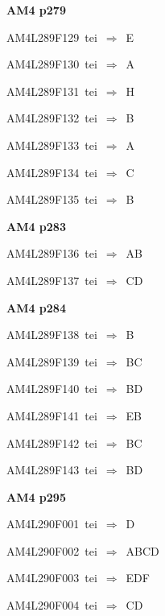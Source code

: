 \par\vfill\eject
{\bf\hfill AM4 p279\hfill\hbox{}}\par\bigskip
{\sixrm AM4L289F129\ {\sixit tei}\ }$\Rightarrow$\ E\par\smallskip
{\sixrm AM4L289F130\ {\sixit tei}\ }$\Rightarrow$\ A\par\smallskip
{\sixrm AM4L289F131\ {\sixit tei}\ }$\Rightarrow$\ H\par\smallskip
{\sixrm AM4L289F132\ {\sixit tei}\ }$\Rightarrow$\ B\par\smallskip
{\sixrm AM4L289F133\ {\sixit tei}\ }$\Rightarrow$\ A\par\smallskip
{\sixrm AM4L289F134\ {\sixit tei}\ }$\Rightarrow$\ C\par\smallskip
{\sixrm AM4L289F135\ {\sixit tei}\ }$\Rightarrow$\ B\par\smallskip

\par\vfill\eject
{\bf\hfill AM4 p283\hfill\hbox{}}\par\bigskip
{\sixrm AM4L289F136\ {\sixit tei}\ }$\Rightarrow$\ AB\par\smallskip
{\sixrm AM4L289F137\ {\sixit tei}\ }$\Rightarrow$\ CD\par\smallskip

\par\vfill\eject
{\bf\hfill AM4 p284\hfill\hbox{}}\par\bigskip
{\sixrm AM4L289F138\ {\sixit tei}\ }$\Rightarrow$\ B\par\smallskip
{\sixrm AM4L289F139\ {\sixit tei}\ }$\Rightarrow$\ BC\par\smallskip
{\sixrm AM4L289F140\ {\sixit tei}\ }$\Rightarrow$\ BD\par\smallskip
{\sixrm AM4L289F141\ {\sixit tei}\ }$\Rightarrow$\ EB\par\smallskip
{\sixrm AM4L289F142\ {\sixit tei}\ }$\Rightarrow$\ BC\par\smallskip
{\sixrm AM4L289F143\ {\sixit tei}\ }$\Rightarrow$\ BD\par\smallskip

\par\vfill\eject
{\bf\hfill AM4 p295\hfill\hbox{}}\par\bigskip
{\sixrm AM4L290F001\ {\sixit tei}\ }$\Rightarrow$\ D\par\smallskip
{\sixrm AM4L290F002\ {\sixit tei}\ }$\Rightarrow$\ ABCD\par\smallskip
{\sixrm AM4L290F003\ {\sixit tei}\ }$\Rightarrow$\ EDF\par\smallskip
{\sixrm AM4L290F004\ {\sixit tei}\ }$\Rightarrow$\ CD\par\smallskip

